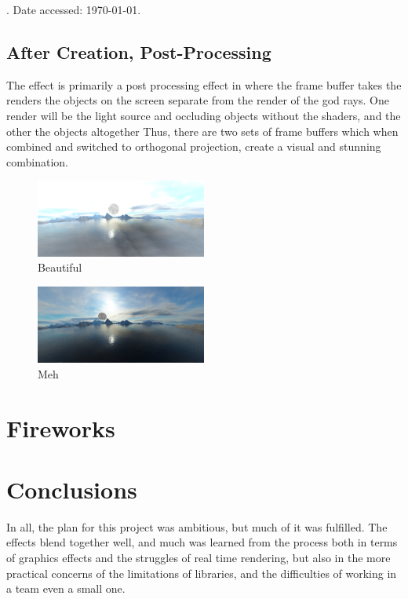 . Date accessed: \today. \\\subsection{After Creation, Post-Processing}

The effect is primarily a post processing effect in where the frame buffer takes the renders the objects on the screen separate from the render of the god rays. One render will be the light source and occluding objects without the shaders, and the other the objects altogether Thus, there are two sets of frame buffers which when combined and switched to orthogonal projection, create a visual and stunning combination. 

\begin{figure}
\includegraphics[width=0.5\textwidth]{god_rays_on} 
\caption{Beautiful}
\end{figure}
\begin{figure}
\includegraphics[width=0.5\textwidth]{godrays_off} 
\caption{Meh}
\end{figure}
\section{Fireworks}

\section{Conclusions}
In all, the plan for this project was ambitious, but much of it was fulfilled. 
The effects blend together well, and much was learned from the process both in terms
of graphics effects and the struggles of real time rendering, but also in the more practical concerns
of the limitations of libraries, and the difficulties of working in a team even a small one. 

